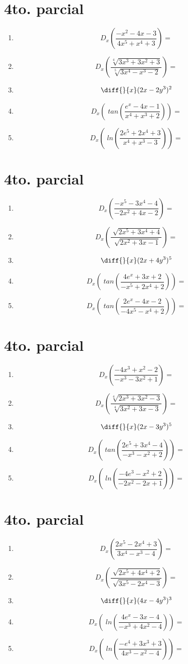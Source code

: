 \documentclass[oneside,spanish,letter]{article}
\begin{document}
\section{4to. parcial}
\begin{enumerate}
 \item $$ D_x \left( \frac{-x^2-4x-3}{4x^5+x^4+3}\right)=$$
 \item $$ D_x \left( \frac{\sqrt[4]{3x^3+3x^2+3}}{\sqrt[5]{3x^4-x^3-2}}\right)=$$
\item $$\diff{}{x}(2x-2y^3)^2$$
 \item $$ D_x \left(\;tan\left( \frac{e^x-4x-1}{x^4+x^3+2}\right)\right)=$$
 \item $$ D_x \left(\;ln\left( \frac{2e^5+2x^4+3}{x^4+x^3-3}\right)\right)=$$
 \end{enumerate}
  \newpage
\section{4to. parcial}
\begin{enumerate}
 \item $$ D_x \left( \frac{-x^5-3x^4-4}{-2x^2+4x-2}\right)=$$
 \item $$ D_x \left( \frac{\sqrt[]{2x^5+3x^4+4}}{\sqrt[]{2x^2+3x-1}}\right)=$$
\item $$\diff{}{x}(2x+4y^3)^5$$
 \item $$ D_x \left(\;tan\left( \frac{4e^x+3x+2}{-x^5+2x^4+2}\right)\right)=$$
 \item $$ D_x \left(\;tan\left( \frac{2e^x-4x-2}{-4x^5-x^4+2}\right)\right)=$$
 \end{enumerate}
  \newpage
\section{4to. parcial}
\begin{enumerate}
 \item $$ D_x \left( \frac{-4x^3+x^2-2}{-x^3-3x^2+1}\right)=$$
 \item $$ D_x \left( \frac{\sqrt[4]{2x^3+3x^2-3}}{\sqrt[4]{3x^2+3x-3}}\right)=$$
\item $$\diff{}{x}(2x-3y^3)^5$$
 \item $$ D_x \left(\;tan\left( \frac{2e^5+3x^4-4}{-x^3-x^2+2}\right)\right)=$$
 \item $$ D_x \left(\;ln\left( \frac{-4e^3-x^2+2}{-2x^2-2x+1}\right)\right)=$$
 \end{enumerate}
  \newpage
\section{4to. parcial}
\begin{enumerate}
 \item $$ D_x \left( \frac{2x^5-2x^4+3}{3x^4-x^3-4}\right)=$$
 \item $$ D_x \left( \frac{\sqrt[]{2x^5+4x^4+2}}{\sqrt[]{3x^5-2x^4-3}}\right)=$$
\item $$\diff{}{x}(4x-4y^3)^3$$
 \item $$ D_x \left(\;ln\left( \frac{4e^x-3x-4}{-x^3+4x^2-4}\right)\right)=$$
 \item $$ D_x \left(\;ln\left( \frac{-e^4+3x^3+3}{4x^3-x^2-4}\right)\right)=$$
 \end{enumerate}
  \newpage
\end{document}
